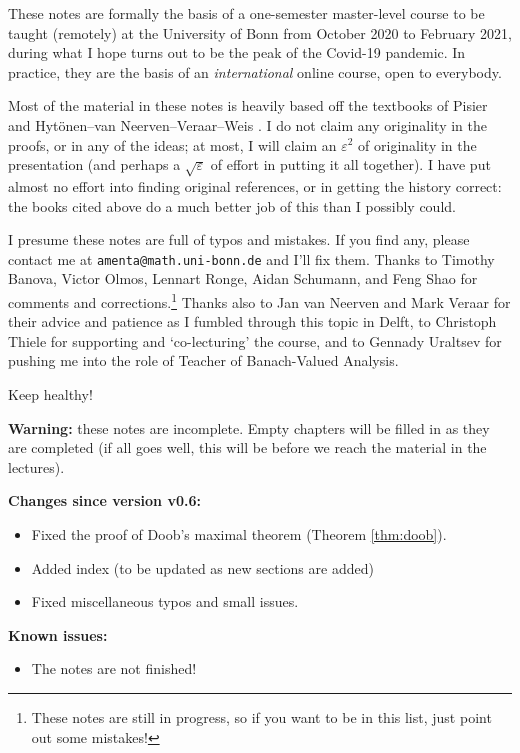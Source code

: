These notes are formally the basis of a one-semester master-level course to be taught (remotely) at the University of Bonn from October 2020 to February 2021, during what I hope turns out to be the peak of the Covid-19 pandemic.
In practice, they are the basis of an \emph{international} online course, open to everybody.

Most of the material in these notes is heavily based off the textbooks of Pisier \cite{gP16} and Hyt\"onen--van Neerven--Veraar--Weis \cite{HNVW16, HNVW17}.
I do not claim any originality in the proofs, or in any of the ideas; at most, I will claim an $\varepsilon^2$ of originality in the presentation (and perhaps a $\sqrt{\varepsilon}$ of effort in putting it all together).
I have put almost no effort into finding original references, or in getting the history correct: the books cited above do a much better job of this than I possibly could.

\vspace{1cm}

I presume these notes are full of typos and mistakes.
If you find any, please contact me at \texttt{amenta@math.uni-bonn.de} and I'll fix them.
Thanks to Timothy Banova, Victor Olmos, Lennart Ronge, Aidan Schumann, and Feng Shao for comments and corrections.\footnote{These notes are still in progress, so if you want to be in this list, just point out some mistakes!}
Thanks also to Jan van Neerven and Mark Veraar for their advice and patience as I fumbled through this topic in Delft, to Christoph Thiele for supporting and `co-lecturing' the course, and to Gennady Uraltsev for pushing me into the role of Teacher of Banach-Valued Analysis.

\vspace{0.5cm}

Keep healthy! 




\vspace{1cm}

\textbf{Warning:} these notes are incomplete.
Empty chapters will be filled in as they are completed (if all goes well, this will be before we reach the material in the lectures).

\textbf{Changes since version v0.6:}
\begin{itemize}
\item Fixed the proof of Doob's maximal theorem (Theorem \ref{thm:doob}).
\item Added index (to be updated as new sections are added)
\item Fixed miscellaneous typos and small issues.
\end{itemize}

\textbf{Known issues:}
\begin{itemize}
\item The notes are not finished!
\end{itemize}

  





